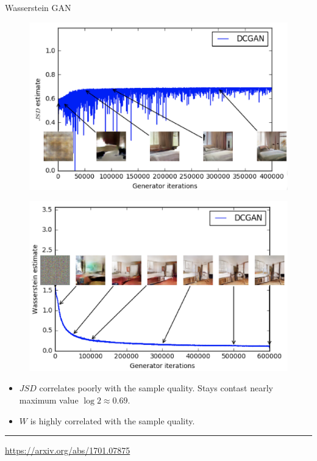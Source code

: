 \documentclass{beamer}
\begin{document}
\begin{frame}{Wasserstein GAN}
	\begin{minipage}[t]{0.49\columnwidth}
		\begin{figure}
			\centering
			\includegraphics[width=1.0\linewidth]{figs/dcgan_quality}
		\end{figure}
	\end{minipage}%
	\begin{minipage}[t]{0.49\columnwidth}
		\begin{figure}
			\centering
			\includegraphics[width=1.0\linewidth]{figs/wgan_quality}
		\end{figure}
	\end{minipage}
	\begin{itemize}
		\item $JSD$ correlates poorly with the sample quality. Stays contast nearly maximum value $\log 2 \approx 0.69$.
		\item $W$ is highly correlated with the sample quality. 
	\end{itemize}
	\vfill
	\hrule\medskip 
	{\scriptsize \href{https://arxiv.org/abs/1701.07875}{https://arxiv.org/abs/1701.07875}}
\end{frame}
\end{document}
